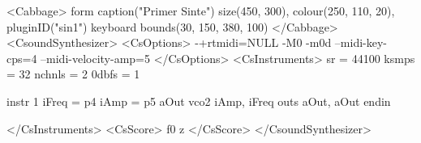<Cabbage>
form caption("Primer Sinte") size(450, 300), colour(250, 110, 20), pluginID("sin1")
keyboard bounds(30, 150, 380, 100)
</Cabbage>
<CsoundSynthesizer>
<CsOptions>
-+rtmidi=NULL -M0 -m0d --midi-key-cps=4 --midi-velocity-amp=5
</CsOptions>
<CsInstruments>
sr = 44100
ksmps = 32
nchnls = 2
0dbfs = 1

instr 1
iFreq = p4
iAmp = p5
aOut vco2 iAmp, iFreq
outs aOut, aOut
endin

</CsInstruments>
<CsScore>
f0 z
</CsScore>
</CsoundSynthesizer>